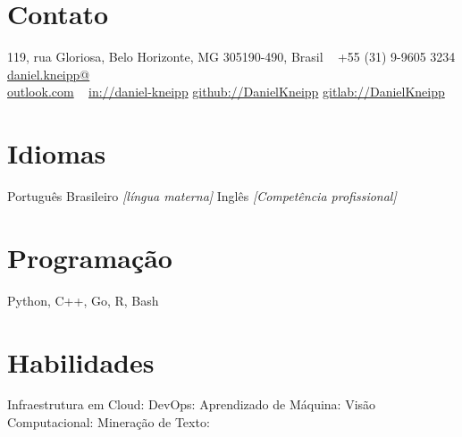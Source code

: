 \documentclass[a4paper]{cv-friggeri-x}
\begin{document}


\begin{aside} %
\section{Contato}
\pin \hfill 119, rua Gloriosa,
Belo Horizonte, MG 
305190-490, Brasil
~
{\Large\textcolor{gray}{\Mobilefone}} \hfill +55 (31) 9-9605 3234
{\Large\textcolor{gray}{\Letter}} \hfill \href{mailto:daniel.kneipp@outlook.com}{daniel.kneipp@\\outlook.com}
~
\llogo \hfill \href{https://www.linkedin.com/in/daniel-kneipp/}{in://daniel-kneipp}
\githublogo \hfill \href{https://github.com/DanielKneipp}{github://DanielKneipp}
\gitlablogo \hfill \href{https://gitlab.com/DanielKneipp}{gitlab://DanielKneipp}
\section{Idiomas}
Português Brasileiro \hspace{5mm}\null
\textit{\footnotesize{[língua materna]}}
Inglês  \hspace{5mm}\null
\textit{\footnotesize{[Competência profissional]}}
\section{Programação}
Python, C++, Go,
R, Bash
\section{Habilidades}
Infraestrutura \hspace{5mm}\null
em Cloud: \hspace{5mm}\null
{}
DevOps: \hspace{5mm}\null
{}
Aprendizado \hspace{5mm}\null
de Máquina: \hspace{5mm}\null
{} 
Visão Computacional:  \hspace{5mm}\null
{}
Mineração de Texto:      \hspace{5mm}\null
{}
\end{aside}
\end{document}
